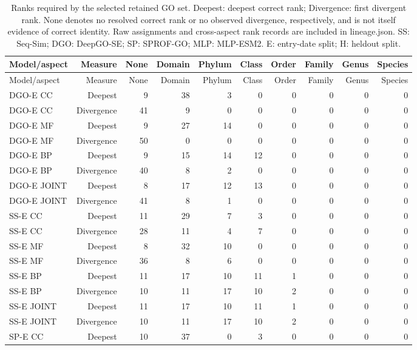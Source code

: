 \begingroup\scriptsize
\setlength{\tabcolsep}{4pt}
\begin{longtable}{lrrrrrrrrr}
\caption{Ranks required by the selected retained GO set. Deepest: deepest correct rank; Divergence: first divergent rank. None denotes no resolved correct rank or no observed divergence, respectively, and is not itself evidence of correct identity. Raw assignments and cross-aspect rank records are included in lineage.json. SS: Seq-Sim; DGO: DeepGO-SE; SP: SPROF-GO; MLP: MLP-ESM2. E: entry-date split; H: heldout split.}\label{tab:supp-lineage}\\
\toprule
Model/aspect & Measure & None & Domain & Phylum & Class & Order & Family & Genus & Species \\
\midrule
\endfirsthead
\toprule
Model/aspect & Measure & None & Domain & Phylum & Class & Order & Family & Genus & Species \\
\midrule
\endhead
DGO-E CC & Deepest & 9 & 38 & 3 & 0 & 0 & 0 & 0 & 0 \\
DGO-E CC & Divergence & 41 & 9 & 0 & 0 & 0 & 0 & 0 & 0 \\
DGO-E MF & Deepest & 9 & 27 & 14 & 0 & 0 & 0 & 0 & 0 \\
DGO-E MF & Divergence & 50 & 0 & 0 & 0 & 0 & 0 & 0 & 0 \\
DGO-E BP & Deepest & 9 & 15 & 14 & 12 & 0 & 0 & 0 & 0 \\
DGO-E BP & Divergence & 40 & 8 & 2 & 0 & 0 & 0 & 0 & 0 \\
DGO-E JOINT & Deepest & 8 & 17 & 12 & 13 & 0 & 0 & 0 & 0 \\
DGO-E JOINT & Divergence & 41 & 8 & 1 & 0 & 0 & 0 & 0 & 0 \\
SS-E CC & Deepest & 11 & 29 & 7 & 3 & 0 & 0 & 0 & 0 \\
SS-E CC & Divergence & 28 & 11 & 4 & 7 & 0 & 0 & 0 & 0 \\
SS-E MF & Deepest & 8 & 32 & 10 & 0 & 0 & 0 & 0 & 0 \\
SS-E MF & Divergence & 36 & 8 & 6 & 0 & 0 & 0 & 0 & 0 \\
SS-E BP & Deepest & 11 & 17 & 10 & 11 & 1 & 0 & 0 & 0 \\
SS-E BP & Divergence & 10 & 11 & 17 & 10 & 2 & 0 & 0 & 0 \\
SS-E JOINT & Deepest & 11 & 17 & 10 & 11 & 1 & 0 & 0 & 0 \\
SS-E JOINT & Divergence & 10 & 11 & 17 & 10 & 2 & 0 & 0 & 0 \\
SP-E CC & Deepest & 10 & 37 & 0 & 3 & 0 & 0 & 0 & 0 \\

\end{longtable}
